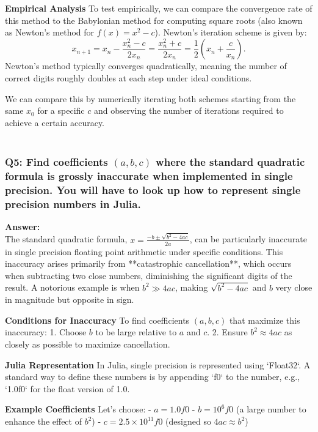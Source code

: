 \documentclass{article}
\begin{document}
\textbf{Empirical Analysis}
To test empirically, we can compare the convergence rate of this method to the Babylonian method for computing square roots (also known as Newton’s method for $f(x) = x^2 - c$). Newton's iteration scheme is given by:
\[
x_{n+1} = x_n - \frac{x_n^2 - c}{2x_n} = \frac{x_n^2 + c}{2x_n} = \frac{1}{2} \left(x_n + \frac{c}{x_n}\right).
\]
Newton's method typically converges quadratically, meaning the number of correct digits roughly doubles at each step under ideal conditions.

We can compare this by numerically iterating both schemes starting from the same $x_0$ for a specific $c$ and observing the number of iterations required to achieve a certain accuracy. \\\\

\subsubsection*{Q5: Find coefficients $(a, b, c)$ where the standard quadratic formula is grossly inaccurate when implemented in single precision. You will have to look up how to represent single precision numbers in Julia.}

\textbf{Answer:}\\
The standard quadratic formula, $x = \frac{-b \pm \sqrt{b^2 - 4ac}}{2a}$, can be particularly inaccurate in single precision floating point arithmetic under specific conditions. This inaccuracy arises primarily from **catastrophic cancellation**, which occurs when subtracting two close numbers, diminishing the significant digits of the result. A notorious example is when $b^2 \gg 4ac$, making $\sqrt{b^2 - 4ac}$ and $b$ very close in magnitude but opposite in sign.

\textbf{Conditions for Inaccuracy}
To find coefficients $(a, b, c)$ that maximize this inaccuracy:
1. Choose $b$ to be large relative to $a$ and $c$.
2. Ensure $b^2 \approx 4ac$ as closely as possible to maximize cancellation.

\textbf{Julia Representation}
In Julia, single precision is represented using `Float32`. A standard way to define these numbers is by appending `f0` to the number, e.g., `1.0f0` for the float version of 1.0.

\textbf{Example Coefficients}
Let's choose:
- \( a = 1.0f0 \)
- \( b = 10^6f0 \) (a large number to enhance the effect of $b^2$)
- \( c = 2.5 \times 10^{11}f0 \) (designed so $4ac \approx b^2$)
\end{document}
